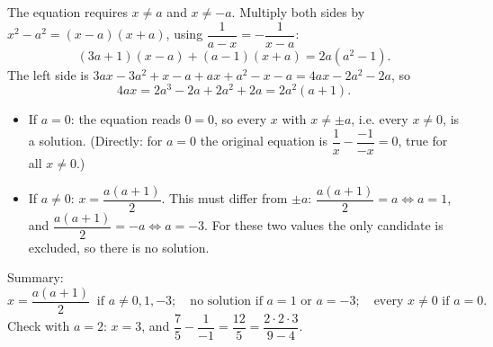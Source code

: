 The equation requires $x\ne a$ and $x\ne-a$. Multiply both sides by $x^2-a^2=(x-a)(x+a)$, using $\dfrac{1}{a-x}=-\dfrac{1}{x-a}$:
\[
(3a+1)(x-a)+(a-1)(x+a)=2a(a^2-1).
\]
The left side is $3ax-3a^2+x-a+ax+a^2-x-a=4ax-2a^2-2a$, so
\[
4ax=2a^3-2a+2a^2+2a=2a^2(a+1).
\]
\begin{itemize}
\item If $a=0$: the equation reads $0=0$, so every $x$ with $x\ne\pm a$, i.e. every $x\ne0$, is a solution. (Directly: for $a=0$ the original equation is $\dfrac{1}{x}-\dfrac{-1}{-x}=0$, true for all $x\ne0$.)
\item If $a\ne0$: $x=\dfrac{a(a+1)}{2}$. This must differ from $\pm a$:
 $\dfrac{a(a+1)}{2}=a\iff a=1$, and $\dfrac{a(a+1)}{2}=-a\iff a=-3$. For these two values the only candidate is excluded, so there is no solution.
\end{itemize}
Summary:
\[
\boxed{x=\dfrac{a(a+1)}{2}\ \text{ if } a\ne0,1,-3;\quad\text{no solution if } a=1\text{ or }a=-3;\quad\text{every }x\ne0\text{ if }a=0.}
\]
Check with $a=2$: $x=3$, and $\dfrac{7}{5}-\dfrac{1}{-1}=\dfrac{12}{5}=\dfrac{2\cdot2\cdot3}{9-4}$.
